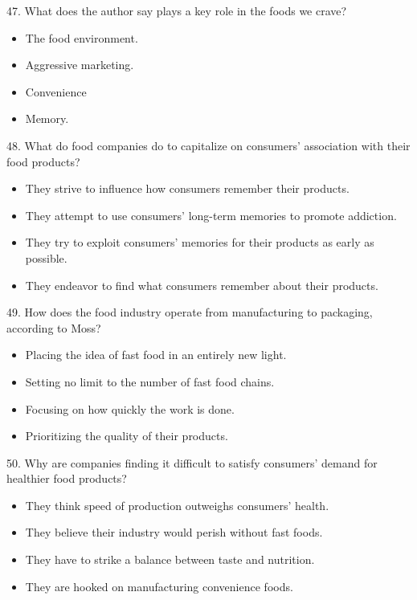 \documentclass[UTF8,11pt]{ctexart}
\begin{document}
47. What does the author say plays a key role in the foods we crave?


\begin{itemize}[leftmargin=2em,itemsep=.2em,topsep=.4em]\item[A.] The food environment.
\item[B.] Aggressive marketing.
\item[C.] Convenience
\item[D.] Memory.
\end{itemize}

48. What do food companies do to capitalize on consumers’ association with their food products?


\begin{itemize}[leftmargin=2em,itemsep=.2em,topsep=.4em]\item[A.] They strive to influence how consumers remember their products.
\item[B.] They attempt to use consumers’ long-term memories to promote addiction.
\item[C.] They try to exploit consumers’ memories for their products as early as possible.
\item[D.] They endeavor to find what consumers remember about their products.
\end{itemize}

49. How does the food industry operate from manufacturing to packaging, according to Moss?


\begin{itemize}[leftmargin=2em,itemsep=.2em,topsep=.4em]\item[A.] Placing the idea of fast food in an entirely new light.
\item[B.] Setting no limit to the number of fast food chains.
\item[C.] Focusing on how quickly the work is done.
\item[D.] Prioritizing the quality of their products.
\end{itemize}

50. Why are companies finding it difficult to satisfy consumers’ demand for healthier food products?


\begin{itemize}[leftmargin=2em,itemsep=.2em,topsep=.4em]\item[A.] They think speed of production outweighs consumers’ health.
\end{itemize}

\begin{itemize}[leftmargin=2em,itemsep=.2em,topsep=.4em]\item[B.] They believe their industry would perish without fast foods.
\item[C.] They have to strike a balance between taste and nutrition.
\item[D.] They are hooked on manufacturing convenience foods.
\end{itemize}
\end{document}
